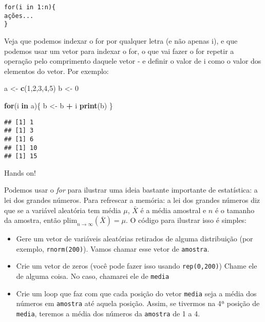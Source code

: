 \documentclass[]{book}
\newenvironment{Shaded}{\begin{snugshade}}{\end{snugshade}}
\newcommand{\KeywordTok}[1]{\textcolor[rgb]{0.13,0.29,0.53}{\textbf{#1}}}
\newcommand{\DecValTok}[1]{\textcolor[rgb]{0.00,0.00,0.81}{#1}}
\newcommand{\StringTok}[1]{\textcolor[rgb]{0.31,0.60,0.02}{#1}}
\newcommand{\ControlFlowTok}[1]{\textcolor[rgb]{0.13,0.29,0.53}{\textbf{#1}}}
\newcommand{\OperatorTok}[1]{\textcolor[rgb]{0.81,0.36,0.00}{\textbf{#1}}}
\newcommand{\NormalTok}[1]{#1}
\providecommand{\tightlist}{%
  \setlength{\itemsep}{0pt}\setlength{\parskip}{0pt}}
\begin{document}
\begin{verbatim}
for(i in 1:n){
ações...
}
\end{verbatim}

Veja que podemos indexar o for por qualquer letra (e não apenas i), e
que podemos usar um vetor para indexar o for, o que vai fazer o for
repetir a operação pelo comprimento daquele vetor - e definir o valor de
i como o valor dos elementos do vetor. Por exemplo:

\begin{Shaded}
\begin{Highlighting}[]
\NormalTok{a <-}\StringTok{ }\KeywordTok{c}\NormalTok{(}\DecValTok{1}\NormalTok{,}\DecValTok{2}\NormalTok{,}\DecValTok{3}\NormalTok{,}\DecValTok{4}\NormalTok{,}\DecValTok{5}\NormalTok{)}
\NormalTok{b <-}\StringTok{ }\DecValTok{0}

\ControlFlowTok{for}\NormalTok{(i }\ControlFlowTok{in}\NormalTok{ a)\{}
\NormalTok{b <-}\StringTok{ }\NormalTok{b }\OperatorTok{+}\StringTok{ }\NormalTok{i}
\KeywordTok{print}\NormalTok{(b)}
\NormalTok{\}}
\end{Highlighting}
\end{Shaded}

\begin{verbatim}
## [1] 1
## [1] 3
## [1] 6
## [1] 10
## [1] 15
\end{verbatim}

Hands on!

Podemos usar o \emph{for} para ilustrar uma ideia bastante importante de
estatística: a lei dos grandes números. Para refrescar a memória: a lei
dos grandes números diz que se a variável aleatória tem média \(\mu\),
\(\bar{X}\) é a média amostral e \(n\) é o tamanho da amostra, então
\(\text{plim}_{n \rightarrow \infty}(\bar{X}) = \mu\). O código para
ilustrar isso é simples:

\begin{itemize}
\tightlist
\item
  Gere um vetor de variáveis aleatórias retirados de alguma distribuição
  (por exemplo, \texttt{rnorm(200)}). Vamos chamar esse vetor de
  \texttt{amostra}.
\item
  Crie um vetor de zeros (você pode fazer isso usando
  \texttt{rep(0,200)}) Chame ele de alguma coisa. No caso, chamarei ele
  de \texttt{media}
\item
  Crie um loop que faz com que cada posição do vetor \texttt{media} seja
  a média dos números em \texttt{amostra} até aquela posição. Assim, se
  tivermos na 4ª posição de \texttt{media}, teremos a média dos números
  da \texttt{amostra} de 1 a 4.
\end{itemize}
\end{document}

